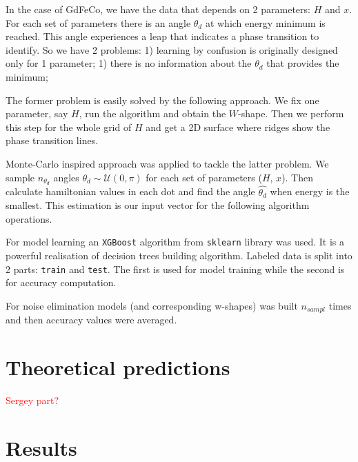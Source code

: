 In the case of GdFeCo, we have the data that depends on 2 parameters: $H$ and $x$.
For each set of parameters there is an angle $\theta_d$ at which energy minimum is reached.
This angle experiences a leap that indicates a phase transition to identify.
So we have 2 problems: 1) learning by confusion is originally designed only for 1 parameter; 1) there is no information about the $\theta_d$ that provides the minimum;

The former problem is easily solved by the following approach.
We fix one parameter, say $H$, run the algorithm and obtain the $W$-shape.
Then we perform this step for the whole grid of $H$ and get a 2D surface where ridges show the phase transition lines.

Monte-Carlo inspired approach was applied to tackle the latter problem.
We sample $n_{\theta_d}$ angles $\theta_d \sim \mathcal{U}(0, \pi)$ for each set of parameters ($H$, $x$).
Then calculate hamiltonian values in each dot and find the angle $\hat{\theta_d}$ when energy is the smallest.
This estimation is our input vector for the following algorithm operations.

For model learning an \texttt{XGBoost} algorithm from \texttt{sklearn} library was used.
It is a powerful realisation of decision trees building algorithm.
Labeled data is split into 2 parts: \texttt{train} and \texttt{test}.
The first is used for model training while the second is for accuracy computation.

For noise elimination models (and corresponding w-shapes) was built $n_{sampl}$ times and then accuracy values were averaged.


\section{Theoretical predictions}
\textcolor{red}{Sergey part?}

\section{Results}

